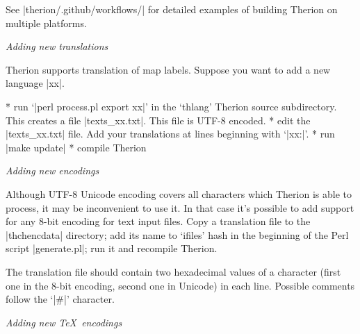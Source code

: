 See |therion/.github/workflows/| for detailed examples of building
Therion on multiple platforms.

{\it Adding new translations}

Therion supports translation of map labels.
Suppose you want to add a new language |xx|.

\list
* run `|perl process.pl export xx|' in the `thlang' Therion source subdirectory.
  This creates a file |texts_xx.txt|. This file is UTF-8 encoded.
* edit the |texts_xx.txt| file. Add your translations at lines beginning with
  `|xx:|'.
* run |make update|
* compile Therion
\endlist


{\it Adding new encodings}

Although UTF-8 Unicode encoding covers all characters which Therion is able to
process, it may be inconvenient to use it. In that case it's possible to add
support for any 8-bit encoding for text input files. Copy a translation file to
the |thchencdata| directory; add its name to `ifiles' hash in the beginning of
the Perl script |generate.pl|; run it and recompile Therion.

The translation file should contain two hexadecimal values of a character
(first one in the 8-bit encoding, second one in Unicode) in each line. Possible
comments follow the `|#|' character.

{\it Adding new \TeX\ encodings}


